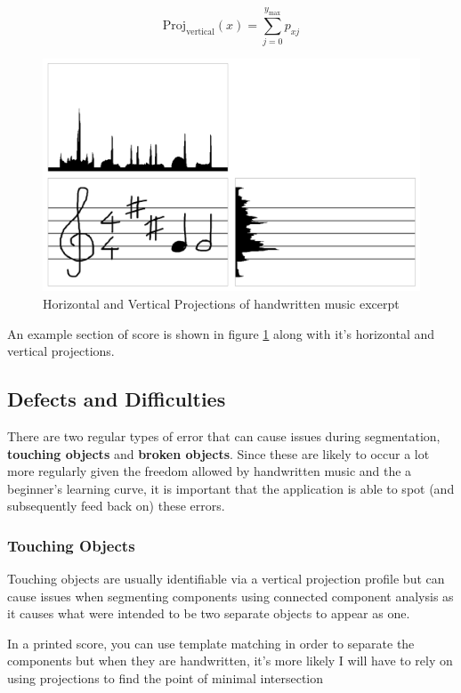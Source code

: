 \begin{equation} \label{eq:vproj}
  \text{Proj}_{\text{vertical}}(x) = \sum_{j = 0}^{y_\text{max}} p_{xj}
\end{equation}

\begin{figure}[h!]
  \centering
  \includegraphics[width=\linewidth]{gfx/technical-background/projection.png}
  \caption{Horizontal and Vertical Projections of handwritten music excerpt}
  \label{fig:stave-projection}
\end{figure}

An example section of score is shown in figure \ref{fig:stave-projection} along with it's horizontal and vertical projections.

\subsection{Defects and Difficulties}

There are two regular types of error that can cause issues during segmentation, \textbf{touching objects} and \textbf{broken objects}. Since these are likely to occur a lot more regularly given the freedom allowed by handwritten music and the a beginner's learning curve, it is important that the application is able to spot (and subsequently feed back on) these errors.

\subsubsection{Touching Objects}

Touching objects are usually identifiable via a vertical projection profile  but can cause issues when segmenting components using  connected component analysis as it causes what were intended to be two separate objects to appear as one.


In a printed score, you can use  template matching in order to separate the components but when they are handwritten, it's more likely I will have to rely on using projections to find the point of minimal intersection 




